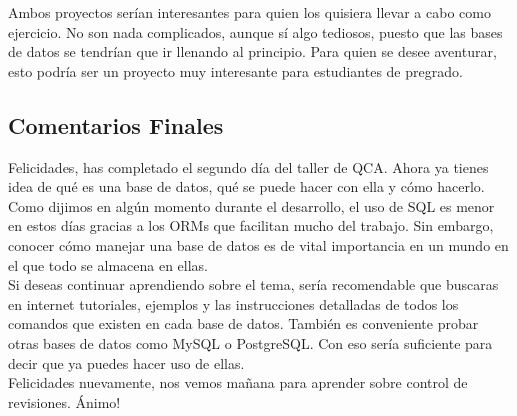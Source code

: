 \documentclass[10pt,letterpaper]{article}
\begin{document}
Ambos proyectos ser\'ian interesantes para quien los quisiera llevar a cabo como ejercicio. No son nada complicados, aunque s\'i algo tediosos, puesto que las bases de datos se tendr\'ian que ir llenando al principio. Para quien se desee aventurar, esto podr\'ia ser un proyecto muy interesante para estudiantes de pregrado.

\subsection{Comentarios Finales}
Felicidades, has completado el segundo d\'ia del taller de QCA. Ahora ya tienes idea de qu\'e es una base de datos, qu\'e se puede hacer con ella y c\'omo hacerlo. Como dijimos en alg\'un momento durante el desarrollo, el uso de SQL es menor en estos d\'ias gracias a los ORMs que facilitan mucho del trabajo. Sin embargo, conocer c\'omo manejar una base de datos es de vital importancia en un mundo en el que todo se almacena en ellas.\\

Si deseas continuar aprendiendo sobre el tema, ser\'ia recomendable que buscaras en internet tutoriales, ejemplos y las instrucciones detalladas de todos los comandos que existen en cada base de datos. Tambi\'en es conveniente probar otras bases de datos como MySQL o PostgreSQL. Con eso ser\'ia suficiente para decir que ya puedes hacer uso de ellas.\\

Felicidades nuevamente, nos vemos ma\~nana para aprender sobre control de revisiones. \'Animo!
\end{document}
